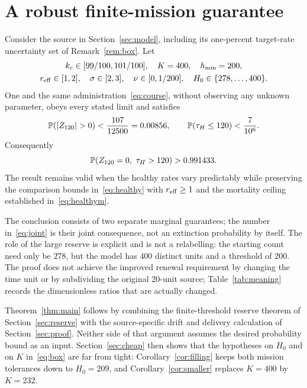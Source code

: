 \section{A robust finite-mission guarantee}\label{sec:main}
\begin{theorem}\label{thm:main}
Consider the source in Section~\ref{sec:model}, including its one-percent target-rate uncertainty set of Remark~\ref{rem:box}. Let
\begin{equation}\label{eq:box}
 \begin{gathered}
 k_e\in[99/100,101/100],\quad K=400,\quad h_{\min}=200,\\
 r_{\mathrm{eff}}\in[1,2],\quad \sigma\in[2,3],\quad
 \nu\in[0,1/200],\quad H_0\in\{278,\ldots,400\}.
 \end{gathered}
\end{equation}
One and the same administration~\eqref{eq:course}, without observing any unknown parameter, obeys every stated limit and satisfies
\begin{equation}\label{eq:mainbounds}
 \Prob(|Z_{120}|>0)<\frac{107}{12500}=0.00856,\qquad
 \Prob(\tau_H\le120)<\frac7{10^6}.
\end{equation}
Consequently
\begin{equation}\label{eq:joint}
 \mathbb P(Z_{120}=0,\ \tau_H>120)>0.991433.
\end{equation}
The result remains valid when the healthy rates vary predictably while preserving the comparison bounds in~\eqref{eq:healthy} with $r_{\mathrm{eff}}\ge1$ and the mortality ceiling established in~\eqref{eq:healthym}.
\end{theorem}

The conclusion consists of two separate marginal guarantees; the number in~\eqref{eq:joint} is their joint consequence, not an extinction probability by itself. The role of the large reserve is explicit and is not a relabelling: the starting count need only be $278$, but the model has $400$ distinct units and a threshold of $200$. The proof does not achieve the improved renewal requirement by changing the time unit or by subdividing the original $20$-unit source; Table~\ref{tab:meaning} records the dimensionless ratios that are actually changed.

Theorem~\ref{thm:main} follows by combining the finite-threshold reserve theorem of Section~\ref{sec:reserve} with the source-specific drift and delivery calculation of Section~\ref{sec:proof}. Neither side of that argument assumes the desired probability bound as an input. Section~\ref{sec:cheap} then shows that the hypotheses on $H_0$ and on $K$ in~\eqref{eq:box} are far from tight: Corollary~\ref{cor:filling} keeps both mission tolerances down to $H_0=209$, and Corollary~\ref{cor:smaller} replaces $K=400$ by $K=232$.
